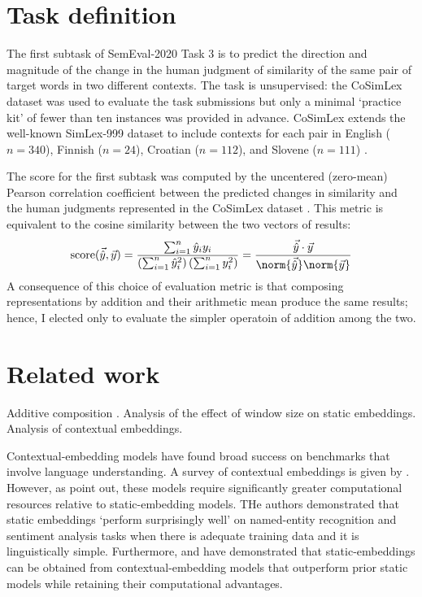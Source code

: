 \section{Task definition}
\label{task-definition}

The first subtask of SemEval-2020 Task 3 is to predict the direction and magnitude of
the change in the human judgment of similarity of the same pair of target words in two
different contexts.
The task is unsupervised: the CoSimLex dataset was used to evaluate the task submissions
but only a minimal `practice kit' of fewer than ten instances was provided in advance.
CoSimLex extends the well-known SimLex-999 dataset \parencite{Hill2015} to include
contexts for each pair in English ($n = 340$), Finnish ($n = 24$), Croatian ($n = 112$),
and Slovene ($n = 111$) \parencite[39-42]{Armendariz2020}.

The score for the first subtask was computed by the uncentered (zero-mean) Pearson
correlation coefficient between the predicted changes in similarity and the human
judgments represented in the CoSimLex dataset \parencite[42]{Armendariz2020}.
This metric is equivalent to the cosine similarity between the two vectors of results:
\begin{equation}
  \text{score}(\vec{\hat{y}}, \vec{y})
  = \frac{\sum_{i = 1}^{n} \hat{y}_i y_i}{\left( \sum_{i = 1}^{n} \hat{y}_i^2 \right)\left( \sum_{i = 1}^{n} y_i^2 \right)}
  = \frac{\vec{\hat{y}} \cdot \vec{y}}{\norm{\vec{\hat{y}}} \norm{\vec{y}}}
\end{equation}
A consequence of this choice of evaluation metric is that composing representations by
addition and their arithmetic mean produce the same results; hence, I elected only to
evaluate the simpler operatoin of addition among the two.

\section{Related work}

Additive composition \parencites[e.g.][]{Kintsch2001}{Mitchell2008}{Mikolov2013a}.
Analysis of the effect of window size on static embeddings.
Analysis of contextual embeddings.

Contextual-embedding models have found broad success on benchmarks that involve language
understanding.
A survey of contextual embeddings is given by \textcite{Liu2020}.
However, as \textcite{Arora2020} point out, these models require significantly greater
computational resources relative to static-embedding models.
THe authors demonstrated that static embeddings `perform surprisingly well' on
named-entity recognition and sentiment analysis tasks when there is adequate training
data and it is linguistically simple.
Furthermore, \textcite{Gupta2019} and \textcite{Bommasani2020} have demonstrated that
static-embeddings can be obtained from contextual-embedding models that outperform
prior static models while retaining their computational advantages.

